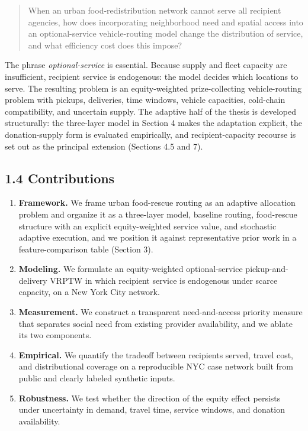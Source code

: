 \documentclass[
  11pt,
]{article}
\providecommand{\tightlist}{%
  \setlength{\itemsep}{0pt}\setlength{\parskip}{0pt}}
\begin{document}
\begin{quote}
When an urban food-redistribution network cannot serve all recipient
agencies, how does incorporating neighborhood need and spatial access
into an optional-service vehicle-routing model change the distribution
of service, and what efficiency cost does this impose?
\end{quote}

The phrase \emph{optional-service} is essential. Because supply and
fleet capacity are insufficient, recipient service is endogenous: the
model decides which locations to serve. The resulting problem is an
equity-weighted prize-collecting vehicle-routing problem with pickups,
deliveries, time windows, vehicle capacities, cold-chain compatibility,
and uncertain supply. The adaptive half of the thesis is developed
structurally: the three-layer model in Section 4 makes the adaptation
explicit, the donation-supply form is evaluated empirically, and
recipient-capacity recourse is set out as the principal extension
(Sections 4.5 and 7).

\subsection{1.4 Contributions}\label{contributions}

\begin{enumerate}
\def\labelenumi{\arabic{enumi}.}
\tightlist
\item
  \textbf{Framework.} We frame urban food-rescue routing as an adaptive
  allocation problem and organize it as a three-layer model, baseline
  routing, food-rescue structure with an explicit equity-weighted
  service value, and stochastic adaptive execution, and we position it
  against representative prior work in a feature-comparison table
  (Section 3).
\item
  \textbf{Modeling.} We formulate an equity-weighted optional-service
  pickup-and-delivery VRPTW in which recipient service is endogenous
  under scarce capacity, on a New York City network.
\item
  \textbf{Measurement.} We construct a transparent need-and-access
  priority measure that separates social need from existing provider
  availability, and we ablate its two components.
\item
  \textbf{Empirical.} We quantify the tradeoff between recipients
  served, travel cost, and distributional coverage on a reproducible NYC
  case network built from public and clearly labeled synthetic inputs.
\item
  \textbf{Robustness.} We test whether the direction of the equity
  effect persists under uncertainty in demand, travel time, service
  windows, and donation availability.
\end{enumerate}
\end{document}
